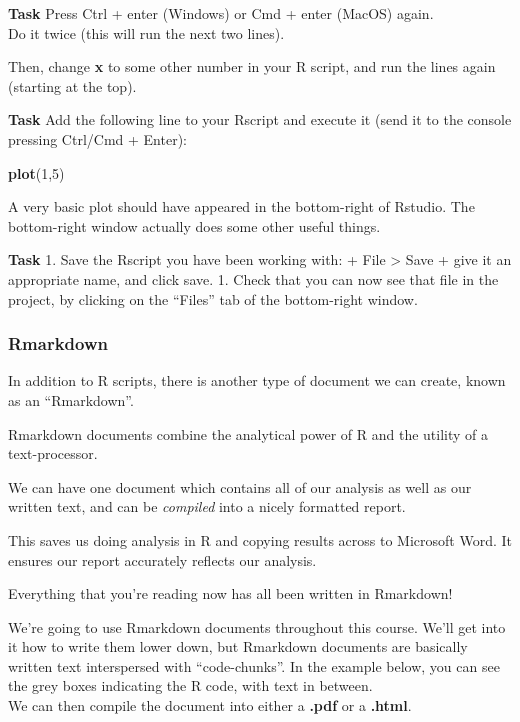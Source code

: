 \documentclass[]{book}
\newenvironment{Shaded}{\begin{snugshade}}{\end{snugshade}}
\newcommand{\DecValTok}[1]{\textcolor[rgb]{0.00,0.00,0.81}{#1}}
\newcommand{\KeywordTok}[1]{\textcolor[rgb]{0.13,0.29,0.53}{\textbf{#1}}}
\newcommand{\NormalTok}[1]{#1}
\begin{document}
\textbf{Task}
Press Ctrl + enter (Windows) or Cmd + enter (MacOS) again.\\
Do it twice (this will run the next two lines).

Then, change \textbf{x} to some other number in your R script, and run the lines again (starting at the top).

\textbf{Task}
Add the following line to your Rscript and execute it (send it to the console pressing Ctrl/Cmd + Enter):

\begin{Shaded}
\begin{Highlighting}[]
\KeywordTok{plot}\NormalTok{(}\DecValTok{1}\NormalTok{,}\DecValTok{5}\NormalTok{)}
\end{Highlighting}
\end{Shaded}

A very basic plot should have appeared in the bottom-right of Rstudio.
The bottom-right window actually does some other useful things.

\textbf{Task}
1. Save the Rscript you have been working with:
+ File \textgreater{} Save
+ give it an appropriate name, and click save.
1. Check that you can now see that file in the project, by clicking on the ``Files'' tab of the bottom-right window.

\hypertarget{rmarkdown}{%
\subsubsection*{Rmarkdown}\label{rmarkdown}}

In addition to R scripts, there is another type of document we can create, known as an ``Rmarkdown''.

Rmarkdown documents combine the analytical power of R and the utility of a text-processor.

We can have one document which contains all of our analysis as well as our written text, and can be \emph{compiled} into a nicely formatted report.

This saves us doing analysis in R and copying results across to Microsoft Word. It ensures our report accurately reflects our analysis.

Everything that you're reading now has all been written in Rmarkdown!

We're going to use Rmarkdown documents throughout this course.
We'll get into it how to write them lower down, but Rmarkdown documents are basically written text interspersed with ``code-chunks''. In the example below, you can see the grey boxes indicating the R code, with text in between.\\
We can then compile the document into either a \textbf{.pdf} or a \textbf{.html}.
\end{document}
